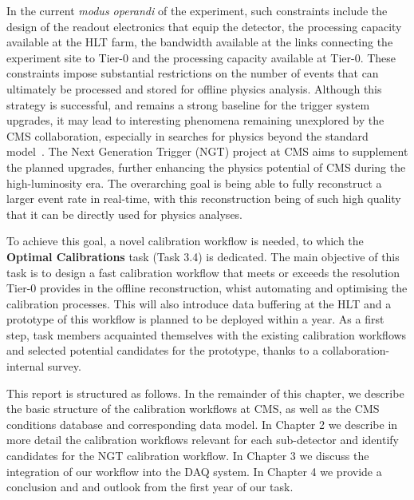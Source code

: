 In the current \textit{modus operandi} of the experiment, such constraints include the design of the readout electronics that equip the detector, the processing capacity available at the HLT farm, the bandwidth available at the links connecting the experiment site to Tier-0 and the processing capacity available at Tier-0. These constraints impose substantial restrictions on the number of events that can ultimately be processed and stored for offline physics analysis. Although this strategy is successful, and remains a strong baseline for the trigger system upgrades, it may lead to interesting phenomena remaining unexplored by the CMS collaboration, especially in searches for physics beyond the standard model~\cite{cms_exotica_summary_plots}.
The Next Generation Trigger (NGT) project at CMS aims to supplement the planned upgrades, further enhancing the physics potential of CMS during the high-luminosity era. The overarching goal is being able to fully reconstruct a larger event rate in real-time, with this reconstruction being of such high quality that it can be directly used for physics analyses.

To achieve this goal, a novel calibration workflow is needed, to which the \textbf{Optimal Calibrations} task (Task 3.4) is dedicated. The main objective of this task is to design a fast calibration workflow that meets or exceeds the resolution Tier-0 provides in the offline reconstruction, whist automating and optimising the calibration processes. This will also introduce data buffering at the HLT and a prototype of this workflow is planned to be deployed within a year. As a first step, task members acquainted themselves with the existing calibration workflows and selected potential candidates for the prototype, thanks to a collaboration-internal survey. 

This report is structured as follows.
In the remainder of this chapter, we describe the basic structure of the calibration workflows at CMS, as well as the CMS conditions database and corresponding data model.
In Chapter 2 we describe in more detail the calibration workflows relevant for each sub-detector and identify candidates for the NGT calibration workflow.
In Chapter 3 we discuss the integration of our workflow into the DAQ system.
In Chapter 4 we provide a conclusion and and outlook from the first year of our task.

